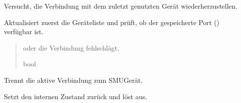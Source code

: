 \documentclass[letterpaper,10pt,english]{sphinxmanual}
\begin{document}
\begin{fulllineitems}
\begin{fulllineitems}
\end{fulllineitems}


\begin{fulllineitems}
\label{\detokenize{modulab/smu_manager:modules.smu.SmuManager.SmuManager.connect_LastDevice}}
\pysigstartsignatures
\pysiglinewithargsret
{}
{}
{}
\pysigstopsignatures
\sphinxAtStartPar
Versucht, die Verbindung mit dem zuletzt genutzten Gerät wiederherzustellen.

\sphinxAtStartPar
Aktualisiert zuerst die Geräteliste und prüft, ob der gespeicherte
Port () verfügbar ist.
\begin{quote}\begin{description}
\sphinxAtStartPar
\begin{description}
\sphinxAtStartPar
oder die Verbindung fehlschlägt.

\end{description}


\sphinxAtStartPar
bool

\end{description}\end{quote}

\end{fulllineitems}


\begin{fulllineitems}
\label{\detokenize{modulab/smu_manager:modules.smu.SmuManager.SmuManager.disconnect}}
\pysigstartsignatures
\pysiglinewithargsret
{}
{}
{}
\pysigstopsignatures
\sphinxAtStartPar
Trennt die aktive Verbindung zum SMU\sphinxhyphen{}Gerät.

\sphinxAtStartPar
Setzt den internen Zustand zurück und löst  aus.

\end{fulllineitems}



\end{fulllineitems}
\end{document}

